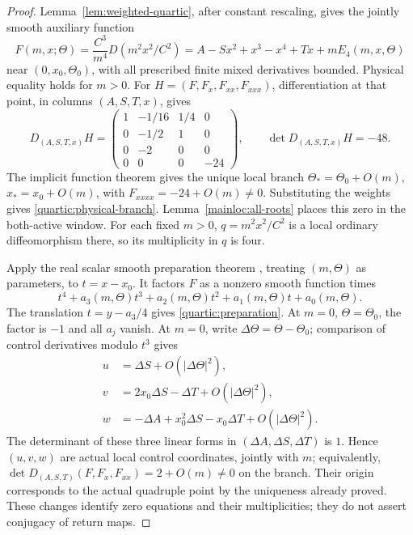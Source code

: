 \begin{proof}
Lemma~\ref{lem:weighted-quartic}, after constant rescaling, gives the
jointly smooth auxiliary function
\begin{equation}\label{quartic:joint-quotient}
 F(m,x;\Theta)=\frac{C^3}{m^4}D(m^2x^2/C^2)
 =A-Sx^2+x^3-x^4+Tx+mE_4(m,x,\Theta)
\end{equation}
near $(0,x_0,\Theta_0)$, with all prescribed finite mixed derivatives
bounded. Physical equality holds for $m>0$.
For $H=(F,F_x,F_{xx},F_{xxx})$, differentiation at that point,
in columns $(A,S,T,x)$, gives
\[
 D_{(A,S,T,x)}H=
 \begin{pmatrix}
 1&-1/16&1/4&0\\
 0&-1/2&1&0\\
 0&-2&0&0\\
 0&0&0&-24
 \end{pmatrix},\qquad \det D_{(A,S,T,x)}H=-48.
\]
The implicit function theorem gives the unique local branch
$\Theta_* =\Theta_0+O(m)$, $x_*=x_0+O(m)$, with
$F_{xxxx}=-24+O(m)\ne0$. Substituting the weights gives
\eqref{quartic:physical-branch}. Lemma~\ref{mainloc:all-roots}
places this zero in the both-active window. For each fixed $m>0$,
$q=m^2x^2/C^2$ is a local ordinary diffeomorphism there, so its
multiplicity in $q$ is four.

Apply the real scalar smooth preparation theorem
\cite[Theorem~5.3]{dencker1993}, treating $(m,\Theta)$ as parameters,
to $t=x-x_0$. It factors $F$ as a nonzero smooth function times
\[
 t^4+a_3(m,\Theta)t^3+a_2(m,\Theta)t^2
                         +a_1(m,\Theta)t+a_0(m,\Theta).
\]
The translation $t=y-a_3/4$ gives \eqref{quartic:preparation}.
At $m=0$, $\Theta=\Theta_0$, the factor is $-1$ and all
$a_j$ vanish. At $m=0$, write $\Delta\Theta=\Theta-\Theta_0$;
comparison of control derivatives modulo $t^3$ gives
\[
 \begin{aligned}
 u&=\Delta S+O(|\Delta\Theta|^2),\\
 v&=2x_0\Delta S-\Delta T+O(|\Delta\Theta|^2),\\
 w&=-\Delta A+x_0^2\Delta S-x_0\Delta T
                                    +O(|\Delta\Theta|^2).
 \end{aligned}
\]
The determinant of these three linear forms in $(\Delta A,\Delta S,
\Delta T)$ is $1$. Hence $(u,v,w)$ are actual local control
coordinates, jointly with $m$; equivalently,
$\det D_{(A,S,T)}(F,F_x,F_{xx})=2+O(m)\ne0$ on the branch.
Their origin corresponds to the actual quadruple point by the
uniqueness already proved. These changes identify zero equations
and their multiplicities; they do not assert conjugacy of return maps.


\end{proof}
